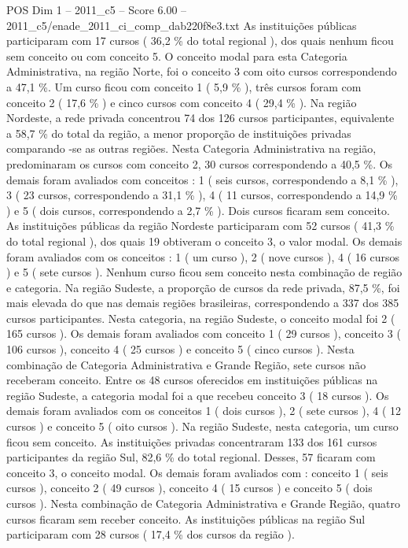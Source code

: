 \begin{textsample}{POS Dim 1 – 2011\_c5 – Score 6.00 – 2011\_c5/enade\_2011\_ci\_comp\_dab220f8e3.txt}
As instituições públicas participaram com 17 cursos ( 36,2 \% do total regional ), dos quais nenhum ficou sem conceito ou com conceito 5.
O conceito modal para esta Categoria Administrativa, na região Norte, foi o conceito 3 com oito cursos correspondendo a 47,1 \%.
Um curso ficou com conceito 1 ( 5,9 \% ), três cursos foram com conceito 2 ( 17,6 \% ) e cinco cursos com conceito 4 ( 29,4 \% ).
Na região Nordeste, a rede privada concentrou 74 dos 126 cursos participantes, equivalente a 58,7 \% do total da região, a menor proporção de instituições privadas comparando -se as outras regiões.
Nesta Categoria Administrativa na região, predominaram os cursos com conceito 2, 30 cursos correspondendo a 40,5 \%.
Os demais foram avaliados com conceitos : 1 ( seis cursos, correspondendo a 8,1 \% ), 3 ( 23 cursos, correspondendo a 31,1 \% ), 4 ( 11 cursos, correspondendo a 14,9 \% ) e 5 ( dois cursos, correspondendo a 2,7 \% ).
Dois cursos ficaram sem conceito.
As instituições públicas da região Nordeste participaram com 52 cursos ( 41,3 \% do total regional ), dos quais 19 obtiveram o conceito 3, o valor modal.
Os demais foram avaliados com os conceitos : 1 ( um curso ), 2 ( nove cursos ), 4 ( 16 cursos ) e 5 ( sete cursos ).
Nenhum curso ficou sem conceito nesta combinação de região e categoria.
Na região Sudeste, a proporção de cursos da rede privada, 87,5 \%, foi mais elevada do que nas demais regiões brasileiras, correspondendo a 337 dos 385 cursos participantes.
Nesta categoria, na região Sudeste, o conceito modal foi 2 ( 165 cursos ).
Os demais foram avaliados com conceito 1 ( 29 cursos ), conceito 3 ( 106 cursos ), conceito 4 ( 25 cursos ) e conceito 5 ( cinco cursos ).
Nesta combinação de Categoria Administrativa e Grande Região, sete cursos não receberam conceito.
Entre os 48 cursos oferecidos em instituições públicas na região Sudeste, a categoria modal foi a que recebeu conceito 3 ( 18 cursos ).
Os demais foram avaliados com os conceitos 1 ( dois cursos ), 2 ( sete cursos ), 4 ( 12 cursos ) e conceito 5 ( oito cursos ).
Na região Sudeste, nesta categoria, um curso ficou sem conceito.
As instituições privadas concentraram 133 dos 161 cursos participantes da região Sul, 82,6 \% do total regional.
Desses, 57 ficaram com conceito 3, o conceito modal.
Os demais foram avaliados com : conceito 1 ( seis cursos ), conceito 2 ( 49 cursos ), conceito 4 ( 15 cursos ) e conceito 5 ( dois cursos ).
Nesta combinação de Categoria Administrativa e Grande Região, quatro cursos ficaram sem receber conceito.
As instituições públicas na região Sul participaram com 28 cursos ( 17,4 \% dos cursos da região ).

\end{textsample}
